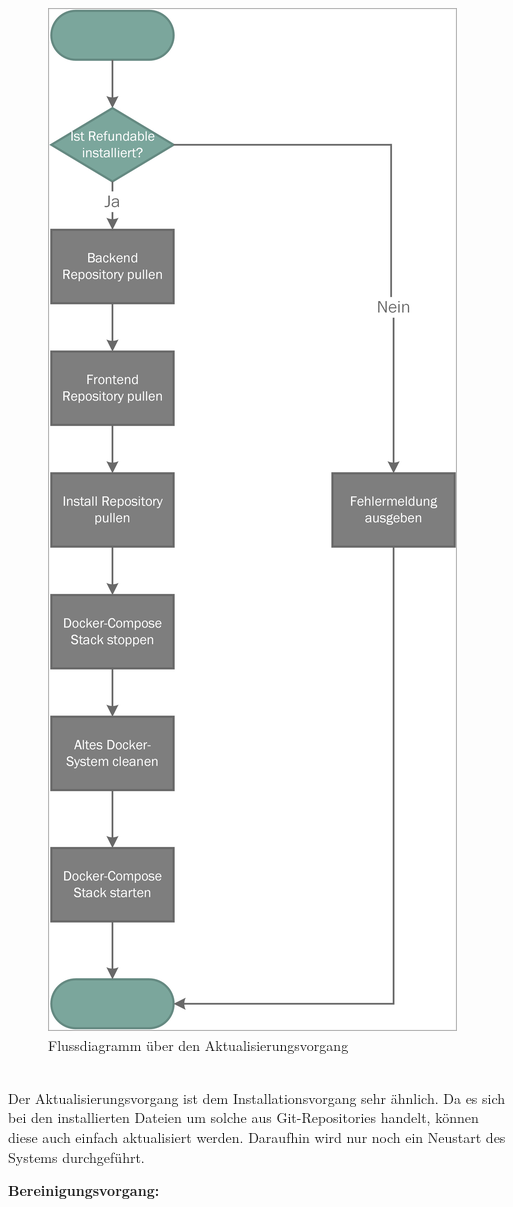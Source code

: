 \begin{figure}[H]
	\centering
	\includegraphics[width=0.47\linewidth]{images/mbeier_konzept/Update_border}
	\caption[Flussdiagramm über den Aktualisierungsvorgang]{Flussdiagramm über den Aktualisierungsvorgang}
	\label{fig:update}
\end{figure}
~\\
Der Aktualisierungsvorgang ist dem Installationsvorgang sehr ähnlich. Da es sich bei den installierten Dateien um solche aus Git-Repositories handelt, können diese auch einfach aktualisiert werden. Daraufhin wird nur noch ein Neustart des Systems durchgeführt.

\newpage

\textbf{Bereinigungsvorgang:}

